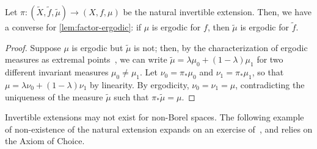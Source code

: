 \documentclass[../main]{subfiles}
\begin{document}
\begin{lemma}\label{lem:inv-ext-ergodic}
  Let \(\pi \colon (\widetilde{X}, \tilde{f}, \tilde{\mu}) \to (X, f, \mu)\) be the natural invertible extension. Then, we have a converse for \cref{lem:factor-ergodic}: if \(\mu\) is ergodic for \(f\), then \(\tilde{\mu}\) is ergodic for \(\tilde{f}\).
\end{lemma}

\begin{proof}
  Suppose \(\mu\) is ergodic but \(\tilde{\mu}\) is not; then, by the characterization of ergodic measures as extremal points~\cite[Proposition 4.3.2.]{vianaFoundationsErgodicTheory2016}, we can write \(\tilde{\mu} = \lambda\mu_0 + (1 - \lambda)\mu_1\) for two different invariant measures \(\mu_0 \neq \mu_1\). Let \(\nu_0 = \pi_*\mu_0\) and \(\nu_1 = \pi_*\mu_1\), so that \(\mu = \lambda\nu_0 + (1 - \lambda)\nu_1\) by linearity. By ergodicity, \(\nu_0 = \nu_1 = \mu\), contradicting the uniqueness of the measure \(\tilde{\mu}\) such that \(\pi_*\tilde{\mu} = \mu\).
\end{proof}

Invertible extensions may not exist for non-Borel spaces. The following example of non-existence of the natural extension expands on an exercise of~\cite{przytyckiConformalFractalsErgodic2010}, and relies on the Axiom of Choice.
\end{document}
